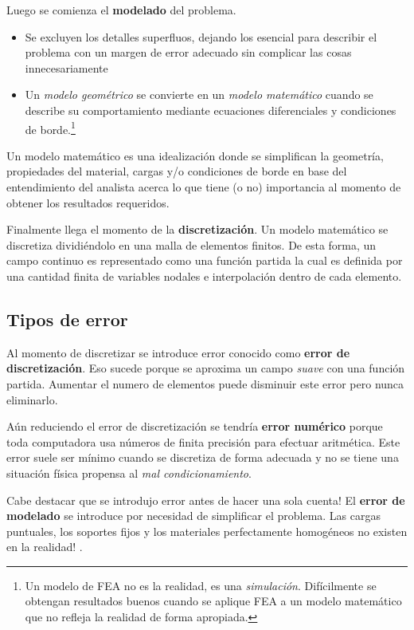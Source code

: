 Luego se comienza el \textbf{modelado} del problema.
\begin{itemize}
	\item Se excluyen los detalles superfluos, dejando los esencial para describir el problema con un margen de error adecuado sin complicar las cosas innecesariamente 
	\item Un \textit{modelo geométrico} se convierte en un \textit{modelo matemático} cuando se describe su comportamiento mediante ecuaciones diferenciales y condiciones de borde.\footnote{Un modelo de FEA no es la realidad, es una \textit{simulación}. Difícilmente se obtengan resultados buenos cuando se aplique FEA a un modelo matemático que no refleja la realidad de forma apropiada.}
	\end{itemize}
Un modelo matemático es una idealización donde se simplifican la geometría, propiedades del material, cargas y/o condiciones de borde en base del entendimiento del analista acerca lo que tiene (o no) importancia al momento de obtener los resultados requeridos.


Finalmente llega el momento de la \textbf{discretización}. Un modelo matemático se discretiza dividiéndolo en una malla de elementos finitos. De esta forma, un campo continuo es representado como una función partida la cual es definida por una cantidad finita de variables nodales e interpolación dentro de cada elemento.
\vspace{-.4cm}
\subsection*{Tipos de error}
Al momento de discretizar se introduce error conocido como \textbf{error de discretización}. Eso sucede porque se aproxima un campo \textit{suave} con una función partida. Aumentar el numero de elementos puede disminuir este error pero nunca eliminarlo.

Aún reduciendo el error de discretización se tendría \textbf{error numérico} porque toda computadora usa números de finita precisión para efectuar aritmética. Este error suele ser mínimo cuando se discretiza de forma adecuada y no se tiene una situación física propensa al \textit{mal condicionamiento}.

Cabe destacar que se introdujo error antes de hacer una sola cuenta! El \textbf{error de modelado} se introduce por necesidad de simplificar el problema. Las cargas puntuales, los soportes fijos y los materiales perfectamente homogéneos no existen en la realidad! \cite{cook2007concepts}.

